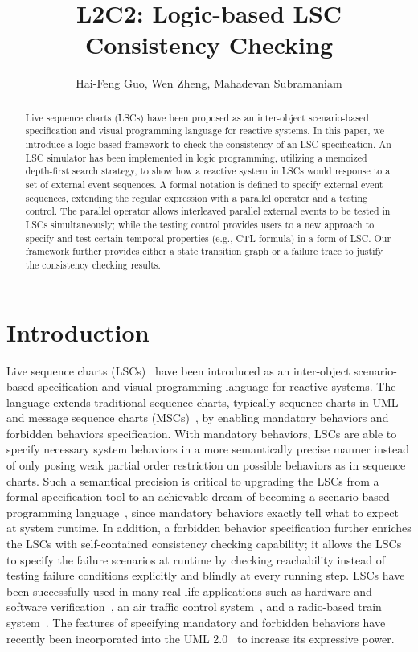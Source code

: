 \documentclass[]{llncs}
\title{L2C2: Logic-based LSC Consistency Checking}
\author{Hai-Feng Guo, Wen Zheng, Mahadevan Subramaniam}
\institute{
        Department of Computer Science\\
        University of Nebraska at Omaha\\
        Omaha, NE 68182-0500, USA\\
        Emails: \{haifengguo,wzheng, msubramaniam\}@mail.unomaha.edu
}
\date{}			\setcounter{page}{1}
\begin{document}
\thispagestyle{empty}
\maketitle



\begin{abstract}
Live sequence charts (LSCs) have been proposed as
an inter-object scenario-based specification and
visual programming language for reactive systems.
In this paper, we introduce a logic-based framework to
check the consistency of an LSC specification.
An LSC simulator has been implemented in logic programming, utilizing a memoized
depth-first search strategy,
to show how a reactive system in LSCs would response to
a set of external event sequences.
A formal notation is defined to specify external event
sequences, extending the regular expression with
a parallel operator and a testing control.
The parallel operator allows interleaved parallel external events
to be tested in LSCs simultaneously;
while the testing control provides users
to a new approach to specify and test certain temporal properties
(e.g., CTL formula) in a form of LSC.
Our framework further provides either a state transition graph or
a failure trace to justify the consistency checking results.
\end{abstract}

\section{Introduction}

Live sequence charts (LSCs)~\cite{DH99,HM03} have been introduced
as an inter-object scenario-based specification and visual programming
language for reactive systems. The language extends  traditional sequence charts,
typically sequence charts in UML~\cite{UMLdocs} and
message sequence charts (MSCs)~\cite{Z120}, by
enabling mandatory behaviors and forbidden behaviors specification.
With mandatory behaviors, LSCs are able to specify necessary
system behaviors in a more semantically precise manner instead
of only posing weak partial order restriction on possible behaviors
as in sequence charts. Such a semantical precision is critical to
upgrading the LSCs from a formal specification tool to
an achievable dream of becoming a scenario-based programming language~\cite{H00},
since mandatory behaviors exactly tell what
to expect at system runtime. In addition, a forbidden behavior
specification further enriches the LSCs with self-contained consistency checking
capability; it allows the LSCs to specify the failure scenarios
at runtime by checking reachability instead of
testing failure conditions explicitly and blindly at every
running step. LSCs have been successfully used in
many real-life applications such as hardware
and software verification~\cite{BGS05,CHK05},
an air traffic control system~\cite{BHK03}, and a radio-based train system~\cite{BDK02}.
The features of specifying mandatory and
forbidden behaviors have recently been incorporated into
the UML 2.0~\cite{UML2} to increase its expressive power.
\end{document}
